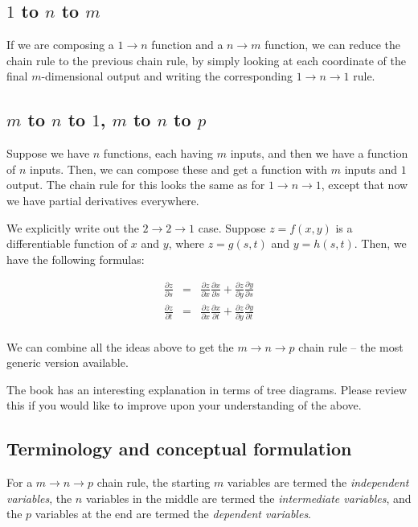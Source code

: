 \documentclass[10pt]{amsart}
\begin{document}
\subsection{$1$ to $n$ to $m$}

If we are composing a $1 \to n$ function and a $n \to m$ function, we
can reduce the chain rule to the previous chain rule, by simply
looking at each coordinate of the final $m$-dimensional output and
writing the corresponding $1 \to n \to 1$ rule.

\subsection{$m$ to $n$ to $1$, $m$ to $n$ to $p$}

Suppose we have $n$ functions, each having $m$ inputs, and then we
have a function of $n$ inputs. Then, we can compose these and get a
function with $m$ inputs and $1$ output. The chain rule for this looks
the same as for $1 \to n \to 1$, except that now we have partial
derivatives everywhere.

We explicitly write out the $2 \to 2 \to 1$ case. Suppose $z = f(x,y)$
is a differentiable function of $x$ and $y$, where $z = g(s,t)$ and $y
= h(s,t)$. Then, we have the following formulas:

\begin{eqnarray*}
  \frac{\partial z}{\partial s} & = & \frac{\partial z}{\partial x} \frac{\partial x}{\partial s} + \frac{\partial z}{\partial y}\frac{\partial y}{\partial s}\\
  \frac{\partial z}{\partial t} & = & \frac{\partial z}{\partial x} \frac{\partial x}{\partial t} + \frac{\partial z}{\partial y}\frac{\partial y}{\partial t}\\
\end{eqnarray*}

We can combine all the ideas above to get the $m \to n \to p$ chain
rule -- the most generic version available.

The book has an interesting explanation in terms of tree
diagrams. Please review this if you would like to improve upon your
understanding of the above.

\subsection{Terminology and conceptual formulation}

For a $m \to n \to p$ chain rule, the starting $m$ variables are
termed the {\em independent variables}, the $n$ variables in the
middle are termed the {\em intermediate variables}, and the $p$
variables at the end are termed the {\em dependent variables}.
\end{document}
